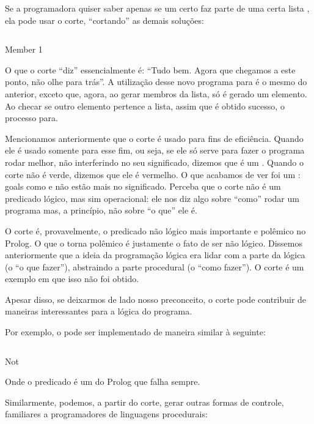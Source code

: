 Se a programadora quiser saber apenas se um certo  faz parte de uma certa lista , ela pode usar o corte, ``cortando'' as demais soluções:

    \begin{listing}
\inputminted{prolog}{../Exemplos/Cap4/prog2_member2.pl}
\caption{Member 1}

    \end{listing}

O que o corte ``diz'' essencialmente é: ``Tudo bem. Agora que chegamos a este ponto, não olhe para trás''. A utilização desse novo programa para  é o mesmo do anterior, exceto que, agora, ao gerar membros da lista, só é gerado um elemento. Ao checar se outro elemento pertence a lista, assim que é obtido sucesso, o processo para.

Mencionamos anteriormente que o corte é usado para fins de eficiência. Quando ele é usado somente para esse fim, ou seja, se ele só serve para fazer o programa rodar melhor, não interferindo no seu significado, dizemos que é um .
Quando o corte não é verde, dizemos que ele é vermelho. O que acabamos de ver foi um : goals como  e  não estão mais no significado. Perceba que o corte não é um predicado lógico, mas sim operacional: ele nos diz algo sobre ``como'' rodar um programa mas, a princípio, não sobre ``o que'' ele é.

O corte é, provavelmente, o predicado não lógico mais importante e polêmico no Prolog. O que o torna polêmico é justamente o fato de ser não lógico. Dissemos anteriormente que a ideia da programação lógica era lidar com a parte da lógica (o ``o que fazer''), abstraindo a parte procedural (o ``como fazer''). O corte é um exemplo em que isso não foi obtido.

Apesar disso, se deixarmos de lado nosso preconceito, o corte pode contribuir de maneiras interessantes para a lógica do programa.

Por exemplo, o  pode ser implementado de maneira similar à seguinte:

    \begin{listing}
\inputminted{prolog}{../Exemplos/Cap4/prog3_not.pl}
\caption{Not}
    \end{listing}

Onde o predicado  é um  do Prolog que falha sempre.

Similarmente, podemos, a partir do corte, gerar outras formas de controle, familiares a programadores de linguagens procedurais:

